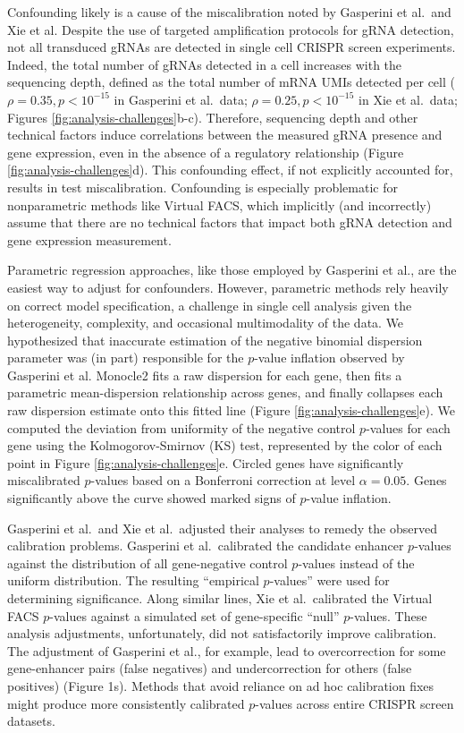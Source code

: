\documentclass{nature}
\begin{document}
Confounding likely is a cause of the miscalibration noted by Gasperini et al.\ and Xie et al. Despite the use of targeted amplification protocols for gRNA detection\cite{Hill2018}, not all transduced gRNAs are detected in single cell CRISPR screen experiments. Indeed, the total number of gRNAs detected in a cell increases with the sequencing depth, defined as the total number of mRNA UMIs detected per cell ($\rho = 0.35, p < 10^{-15}$ in Gasperini et al.\ data; $\rho = 0.25, p < 10^{-15}$ in Xie et al.\ data; Figures \ref{fig:analysis-challenges}b-c). Therefore, sequencing depth and other technical factors induce correlations between the measured gRNA presence and gene expression, even in the absence of a regulatory relationship (Figure \ref{fig:analysis-challenges}d). This confounding effect, if not explicitly accounted for, results in test miscalibration. Confounding is especially problematic for nonparametric methods like Virtual FACS, which implicitly (and incorrectly) assume that there are no technical factors that impact both gRNA detection and gene expression measurement.

Parametric regression approaches, like those employed by Gasperini et al., are the easiest way to adjust for confounders. However, parametric methods rely heavily on correct model specification, a challenge in single cell analysis given the heterogeneity, complexity, and occasional multimodality of the data. We hypothesized that inaccurate estimation of the negative binomial dispersion parameter was (in part) responsible for the $p$-value inflation observed by Gasperini et al. Monocle2 fits a raw dispersion for each gene, then fits a parametric mean-dispersion relationship across genes, and finally collapses each raw dispersion estimate onto this fitted line (Figure \ref{fig:analysis-challenges}e). We computed the deviation from uniformity of the negative control $p$-values for each gene using the Kolmogorov-Smirnov (KS) test, represented by the color of each point in Figure \ref{fig:analysis-challenges}e. Circled genes have significantly miscalibrated $p$-values based on a Bonferroni correction at level $\alpha = 0.05$. Genes significantly above the curve showed marked signs of $p$-value inflation.

Gasperini et al.\ and Xie et al.\ adjusted their analyses to remedy the observed calibration problems. Gasperini et al.\ calibrated the candidate enhancer $p$-values against the distribution of all gene-negative control $p$-values instead of the uniform distribution. The resulting ``empirical $p$-values'' were used for determining significance. Along similar lines, Xie et al.\ calibrated the Virtual FACS $p$-values against a simulated set of gene-specific ``null'' $p$-values. These analysis adjustments, unfortunately, did not satisfactorily improve calibration. The adjustment of Gasperini et al., for example, lead to overcorrection for some gene-enhancer pairs (false negatives) and undercorrection for others (false positives) (Figure 1s). Methods that avoid reliance on ad hoc calibration fixes might produce more consistently calibrated $p$-values across entire CRISPR screen datasets.
\end{document}
